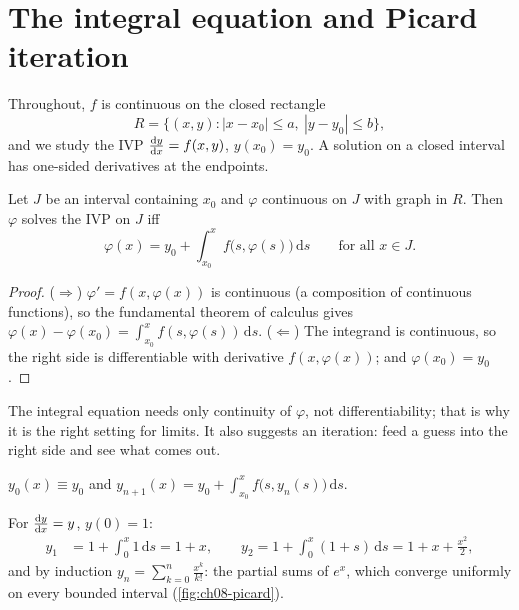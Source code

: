 \section{The integral equation and Picard iteration}\label{sec:ch08-picard}

Throughout, $f$ is continuous on the closed rectangle
\begin{equation}\label{eq:ch08-rectangle}
  R = \bigl\{(x,y): |x - x_0|\le a,\ |y - y_0|\le b\bigr\},
\end{equation}
and we study the IVP $\frac{\mathrm{d}y}{\mathrm{d}x} = f(x,y)$, $y(x_0) = y_0$. A solution on a
closed interval has one-sided derivatives at the endpoints.

\begin{lemma}\label{lem:ch08-integral}
Let $J$ be an interval containing $x_0$ and $\varphi$ continuous on $J$ with
graph in $R$. Then $\varphi$ solves the IVP on $J$ iff
\begin{equation}\label{eq:ch08-integral}
  \varphi(x) = y_0 + \int_{x_0}^{x}f\bigl(s,\varphi(s)\bigr)\,\mathrm{d}s
  \qquad\text{for all } x\in J .
\end{equation}
\end{lemma}
\begin{proof}
($\Rightarrow$) $\varphi' = f(x,\varphi(x))$ is continuous (a composition of
continuous functions), so the fundamental theorem of calculus gives
$\varphi(x) - \varphi(x_0) = \int_{x_0}^x f(s,\varphi(s))\,\mathrm{d}s$.
($\Leftarrow$) The integrand is continuous, so the right side is differentiable
with derivative $f(x,\varphi(x))$; and $\varphi(x_0) = y_0$.
\end{proof}

The integral equation needs only continuity of $\varphi$, not differentiability;
that is why it is the right setting for limits. It also suggests an iteration:
feed a guess into the right side and see what comes out.

\begin{definition}\label{def:ch08-picard}
$y_0(x)\equiv y_0$ and
$\displaystyle y_{n+1}(x) = y_0 + \int_{x_0}^{x}f\bigl(s,y_n(s)\bigr)\,\mathrm{d}s$.
\end{definition}

\begin{example}\label{ex:ch08-picard-exp}
For $\frac{\mathrm{d}y}{\mathrm{d}x} = y$, $y(0) = 1$:
\begin{align*}
  y_1 &= 1 + \int_0^x 1\,\mathrm{d}s = 1 + x,\qquad
  y_2 = 1 + \int_0^x(1 + s)\,\mathrm{d}s = 1 + x + \frac{x^2}{2},
\end{align*}
and by induction $y_n = \sum_{k=0}^n\frac{x^k}{k!}$: the partial sums of $e^x$,
which converge uniformly on every bounded interval (\cref{fig:ch08-picard}).
\end{example}

